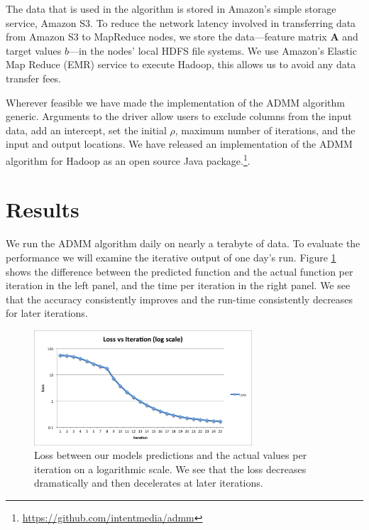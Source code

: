 \documentclass[10pt, conference, compsocconf]{IEEEtran}
\begin{document}
The data that is used in the algorithm is stored in Amazon's simple storage service, Amazon S3.  To reduce the network latency involved in transferring data from Amazon S3 to MapReduce nodes, we store the data---feature matrix $\mathbf{A}$ and target values $b$---in the nodes' local HDFS file systems.  We use Amazon's Elastic Map Reduce (EMR) service to execute Hadoop, this allows us to avoid any data transfer fees.

Wherever feasible we have made the implementation of the ADMM algorithm generic.  Arguments to the driver allow users to exclude columns from the input data, add an intercept, set the initial $\rho$, maximum number of iterations, and the input and output locations. We have released an implementation of the ADMM algorithm for Hadoop as an open source Java package.\footnote{\url{https://github.com/intentmedia/admm}}.

\section{Results}\label{sec:results}
We run the ADMM algorithm daily on nearly a terabyte of data.  To evaluate the performance we will examine the iterative output of one day's run.  Figure \ref{fig:iter} shows the difference between the predicted function and the actual function per iteration in the left panel, and the time per iteration in the right panel.  We see that the accuracy consistently improves and the run-time consistently decreases for later iterations.

\begin{figure}[!t]
\centering
\includegraphics[width=3.2in]{iter_rnorm_plot}
\caption{Loss between our models predictions and the actual values per iteration on a logarithmic scale.  We see that the loss decreases dramatically and then decelerates at later iterations.}
\label{fig:iter}
\end{figure}
\end{document}
